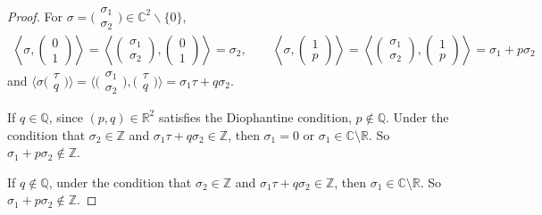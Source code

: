 \documentclass[pdftex]{sigma}
\numberwithin{equation}{section}
\begin{document}
\begin{proof}
For $\sigma =\bigl(\begin{smallmatrix}\sigma_1\\\sigma_2\end{smallmatrix}\bigr) \in \mathbb{C}^2 \backslash \{ 0 \}$,
\begin{gather*}
\left\langle \sigma,\begin{pmatrix}0 \\1\end{pmatrix} \right\rangle =\left\langle \begin{pmatrix}\sigma_1\\
\sigma_2\end{pmatrix}, \begin{pmatrix}0 \\1\end{pmatrix} \right\rangle =\sigma_2, \qquad \left\langle \sigma,\begin{pmatrix}1 \\p\end{pmatrix} \right\rangle=\left\langle \begin{pmatrix}\sigma_1\\
\sigma_2\end{pmatrix}, \begin{pmatrix} 1 \\p \end{pmatrix} \right\rangle =\sigma_1+p\sigma_2
\end{gather*}
and $\bigl\langle \sigma\bigl(\begin{smallmatrix}\tau \\q\end{smallmatrix}\bigr) \bigr\rangle =\bigl\langle \bigl(\begin{smallmatrix}\sigma_1\\
\sigma_2\end{smallmatrix}\bigr), \bigl(\begin{smallmatrix} \tau \\ q \end{smallmatrix}\bigr) \bigr\rangle =\sigma_1 \tau+q\sigma_2$.

If $q \in \mathbb{Q}$, since $(p,q) \in \mathbb{R}^2$ satisfies the Diophantine condition, $p \notin \mathbb{Q}$. Under the condition that $\sigma_2 \in \mathbb{Z}$ and $\sigma_1 \tau + q\sigma_2\in \mathbb{Z}$, then $\sigma_1=0$ or $\sigma_1 \in \mathbb{C} \setminus \mathbb{R}$. So $\sigma_1 + p\sigma_2\notin \mathbb{Z}$.

If $q \notin \mathbb{Q}$, under the condition that $\sigma_2 \in \mathbb{Z}$ and $\sigma_1 \tau + q\sigma_2\in \mathbb{Z}$, then $\sigma_1 \in \mathbb{C} \setminus \mathbb{R}$. So $\sigma_1 + p\sigma_2\notin \mathbb{Z}$.


\end{proof}
\end{document}
